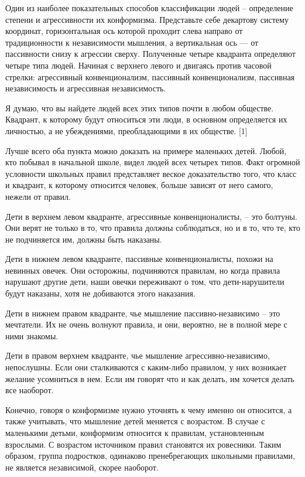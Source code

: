 \documentclass[ebook,12pt,oneside,openany]{memoir}
\begin{document}
\maketitle

Один из наиболее показательных способов классификации людей –
определение степени и агрессивности их конформизма. Представьте себе
декартову систему координат, горизонтальная ось которой проходит слева
направо от традиционности к независимости мышления, а вертикальная ось
— от пассивности снизу к агрессии сверху. Полученные четыре квадранта
определяют четыре типа людей. Начиная с верхнего левого и двигаясь
против часовой стрелки: агрессивный конвенционализм, пассивный
конвенционализм, пассивная независимость и агрессивная независимость.

Я думаю, что вы найдете людей всех этих типов почти в любом обществе.
Квадрант, к которому будут относиться эти люди, в основном
определяется их личностью, а не убеждениями, преобладающими в их
обществе. [1]

Лучше всего оба пункта можно доказать на примере маленьких детей.
Любой, кто побывал в начальной школе, видел людей всех четырех типов.
Факт огромной условности школьных правил представляет веское
доказательство того, что класс и квадрант, к которому относится
человек, больше зависят от него самого, нежели от правил.

Дети в верхнем левом квадранте, агрессивные конвенционалисты, – это
болтуны. Они верят не только в то, что правила должны соблюдаться, но
и в то, что те, кто не подчиняется им, должны быть наказаны.

Дети в нижнем левом квадранте, пассивные конвенционалисты, похожи на
невинных овечек. Они осторожны, подчиняются правилам, но когда правила
нарушают другие дети, наши овечки переживают о том, что
дети-нарушители будут наказаны, хотя не добиваются этого наказания.

Дети в нижнем правом квадранте, чье мышление пассивно-независимо – это
мечтатели. Их не очень волнуют правила, и они, вероятно, не в полной
мере с ними знакомы.

Дети в правом верхнем квадранте, чье мышление агрессивно-независимо,
непослушны. Если они сталкиваются с каким-либо правилом, у них
возникает желание усомниться в нем. Если им говорят что и как делать,
им хочется делать все наоборот.

Конечно, говоря о конформизме нужно уточнять к чему именно он
относится, а также учитывать, что мышление детей меняется с возрастом.
В случае с маленькими детьми, конформизм относится к правилам,
установленным взрослыми. С возрастом источником правил становятся их
ровесники. Таким образом, группа подростков, одинаково пренебрегающих
школьными правилами, не является независимой, скорее наоборот.
\end{document}
